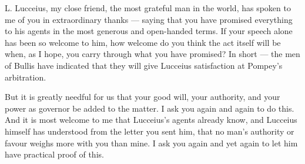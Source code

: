 

 L. Lucceius, my close friend, the most grateful man in the world, has spoken to me of you in extraordinary thanks --- saying that you have promised everything to his agents in the most generous and open-handed terms. If your speech alone has been so welcome to him, how welcome do you think the act itself will be when, as I hope, you carry through what you have promised? In short --- the men of Bullis have indicated that they will give Lucceius satisfaction at Pompey's arbitration.

 But it is greatly needful for us that your good will, your authority, and your power as governor be added to the matter. I ask you again and again to do this. And it is most welcome to me that Lucceius's agents already know, and Lucceius himself has understood from the letter you sent him, that no man's authority or favour weighs more with you than mine. I ask you again and yet again to let him have practical proof of this.

